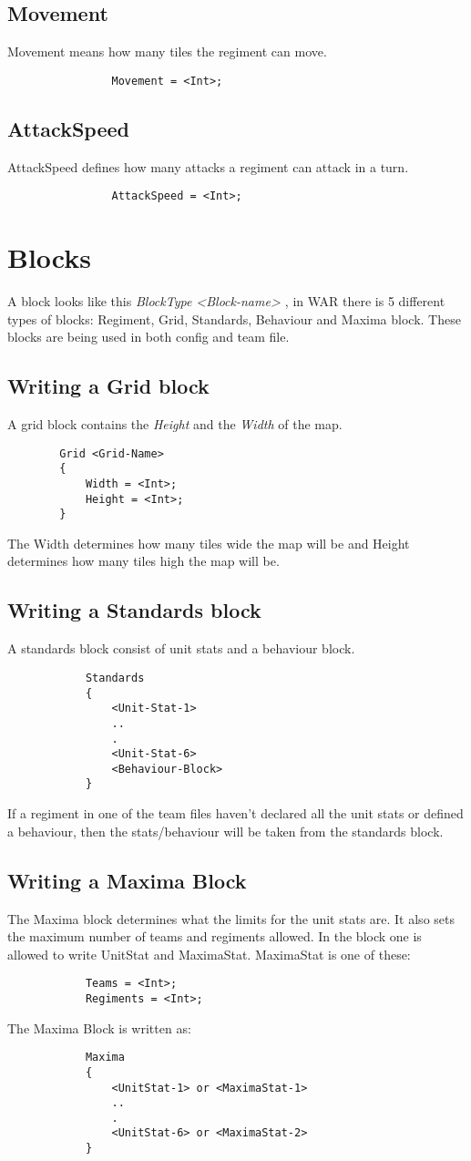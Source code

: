 		\subsection{Movement}
			Movement means how many tiles the regiment can move.
			\begin{verbatim}
				Movement = <Int>;
			\end{verbatim}
		\subsection{AttackSpeed}
			AttackSpeed defines how many attacks a regiment can attack in a turn.
			\begin{verbatim}
				AttackSpeed = <Int>;
			\end{verbatim}
\section{Blocks}
	A block looks like this {\it BlockType <Block-name> { } }, in WAR there is 5 different types of blocks: 
	Regiment, Grid, Standards, Behaviour and Maxima block. These blocks are being used in both config and team file.
	\subsection{Writing a Grid block}
		A grid block contains the {\it Height} and the {\it Width }of the map.
		\begin{verbatim}
		Grid <Grid-Name>
		{
			Width = <Int>;
			Height = <Int>;
		}
		\end{verbatim}	
		The Width determines how many tiles wide the map will be and Height determines how many tiles high the map will be.
	\subsection{Writing a Standards block}
		A standards block consist of unit stats and a behaviour block. 
		\begin{verbatim}
			Standards
			{
				<Unit-Stat-1>
				..
				.
				<Unit-Stat-6>
				<Behaviour-Block>
			}
		\end{verbatim}
		If a regiment in one of the team files haven't declared all the unit stats
		or defined a behaviour, then the stats/behaviour will be taken from the standards block.
	\subsection{Writing a Maxima Block}
		The Maxima block determines what the limits for the unit stats are. It also sets the maximum number of teams and regiments allowed.
		In the block one is allowed to write UnitStat and MaximaStat.
		MaximaStat is one of these:\\
		\begin{verbatim}
			Teams = <Int>;
			Regiments = <Int>;
		\end{verbatim}
		The Maxima Block is written as: \\
		\begin{verbatim}
			Maxima
			{
				<UnitStat-1> or <MaximaStat-1>
				..
				.
				<UnitStat-6> or <MaximaStat-2>
			}
		\end{verbatim}

